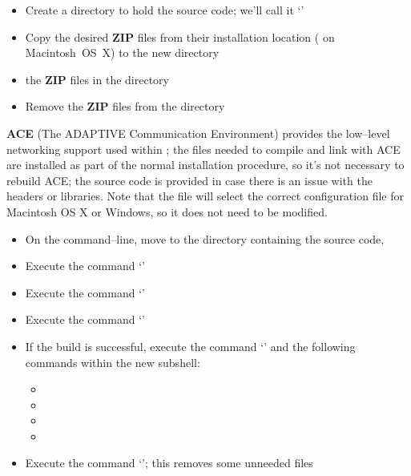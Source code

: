 \tertiaryEnd{}
\secondaryEnd{}
\begin{itemize}
\item Create a directory to hold the source code; we'll call it `'
\item Copy the desired \textbf{ZIP} files from their installation location
( on Macintosh~OS~X) to the new directory 
\item {} the \textbf{ZIP} files in the directory 
\item Remove the \textbf{ZIP} files from the  directory
\end{itemize}
\secondaryEnd{}
\textbf{ACE} (The ADAPTIVE Communication Environment) provides the low--level networking
support used within \mplusm{}; the files needed to compile and link with ACE are installed
as part of the normal \mplusm{} installation procedure, so it's not necessary to rebuild
ACE; the source code is provided in case there is an issue with the headers or libraries.
Note that the file  will select the
correct configuration file for Macintosh OS X or Windows, so it does not need to be
modified.
\begin{itemize}
\item On the command--line, move to the directory containing the \mplusm{} source code,
\item Execute the command `'
\item Execute the command `'
\item Execute the command `'
\item If the build is successful, execute the command `' and the following
commands within the new subshell:
\begin{itemize}
\item {}
\item {}
\item {}
\item {}
\end{itemize}
\item Execute the command `'; this removes some unneeded
files
\end{itemize}
